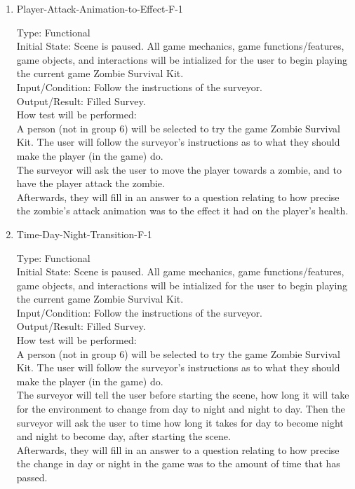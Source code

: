 \documentclass[12pt, titlepage]{article}
\newcounter{ftnum}
\newcounter{nftnum}
\begin{document}
\begin{enumerate}
	
	\item{Player-Attack-Animation-to-Effect-F-1\\}  \label{NF10}
	
	Type: Functional\\
	
	Initial State: Scene is paused. All game mechanics, game functions/features, game objects, and interactions will be intialized for the user to begin playing the current game Zombie Survival Kit.\\
	
	Input/Condition: Follow the instructions of the surveyor.\\
	
	Output/Result: Filled Survey.\\
	
	How test will be performed:\\ A person (not in group 6) will be selected to try the game Zombie Survival Kit. The user will follow the surveyor's instructions as to what they should make the player (in the game) do. \\
	The surveyor will ask the user to move the player towards a zombie, and to have the player attack the zombie.\\
	Afterwards, they will fill in an answer to a question relating to how precise the zombie's attack animation was to the effect it had on the player's health.\\		
	
	\item{Time-Day-Night-Transition-F-1\\}  \label{NF11}
	
	Type: Functional\\
	
	Initial State: Scene is paused. All game mechanics, game functions/features, game objects, and interactions will be intialized for the user to begin playing the current game Zombie Survival Kit.\\
	
	Input/Condition: Follow the instructions of the surveyor.\\
	
	Output/Result: Filled Survey.\\
	
	How test will be performed:\\ A person (not in group 6) will be selected to try the game Zombie Survival Kit. The user will follow the surveyor's instructions as to what they should make the player (in the game) do. \\
	The surveyor will tell the user before starting the scene, how long it will take for the environment to change from day to night and night to day. Then the surveyor will ask the user to time how long it takes for day to become night and night to become day, after starting the scene. \\
	Afterwards, they will fill in an answer to a question relating to how precise the change in day or night in the game was to the amount of time that has passed.\\
	

\end{enumerate}
\end{document}
